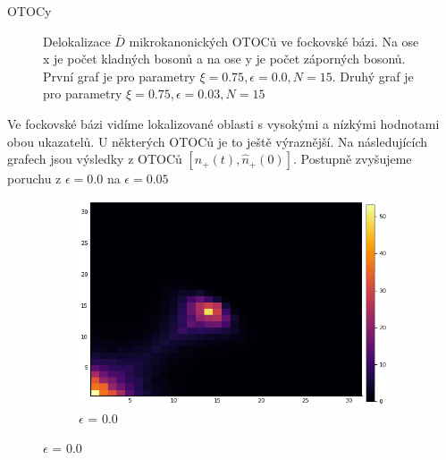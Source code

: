 \documentclass{article}
\begin{document}
\begin{section}{OTOCy}
\begin{figure}[H]
\begin{subfigure}{.5\textwidth}
                        \end{subfigure}
                        \caption{Delokalizace $\bar{D}$ mikrokanonických OTOCů ve fockovské bázi. Na ose x je počet kladných bosonů a na 
                        ose y je počet záporných bosonů. První graf je pro parametry $\xi = 0.75, \epsilon = 0.0, N = 15$.
                        Druhý graf je pro parametry $\xi = 0.75, \epsilon = 0.03, N = 15$}
                        \end{figure}

            
                        Ve fockovské bázi vidíme lokalizované oblasti s vysokými a nízkými hodnotami obou ukazatelů. U některých 
                        OTOCů je to ještě výraznější. Na následujících grafech jsou výsledky z OTOCů $[\hat{n}_+(t),\hat{n}_+(0)]$.
                        Postupně zvyšujeme poruchu z $\epsilon = 0.0$ na $\epsilon = 0.05$ 

                        \begin{figure}[H]
                            \begin{subfigure}{.33\textwidth}
                              \centering
                              \includegraphics[width=1.0\linewidth]{1.png}
                              \caption{$\epsilon$ = 0.0}
                             

\end{subfigure}
\end{figure}
\end{section}
\end{document}
